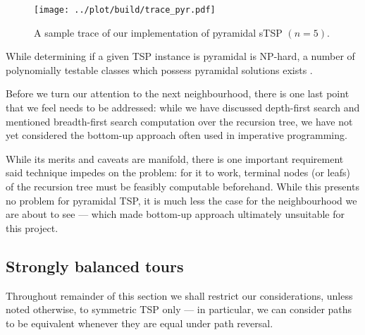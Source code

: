 \documentclass[titlepage,twoside,index=totoc,bibliography=totoc]{scrartcl}
\numberwithin{equation}{section}
\numberwithin{figure}{section}
\numberwithin{table}{section}
\begin{document}
\begin{figure}[hbt]
\centering
\texttt{[image: ../plot/build/trace\_pyr.pdf]}
\caption{A sample trace of our implementation of pyramidal sTSP $(n = 5)$.}
\label{fig:pyrstrace}
\end{figure}

\begin{remark}
While determining if a given TSP instance is pyramidal is NP-hard,
a number of polynomially testable classes which possess
pyramidal solutions exists \cite{baki}.
\end{remark}

Before we turn our attention to the next neighbourhood, there is one last
point that we feel needs to be addressed: while we have discussed
depth-first search and mentioned breadth-first search computation over the
recursion tree, we have not yet considered the bottom-up approach often
used in imperative programming.

While its merits and caveats
are manifold, there is one important requirement said technique impedes on the
problem: for it to work, terminal nodes (or leafs) of the recursion tree
must be feasibly computable beforehand.  While this presents no problem
for pyramidal TSP, it is much less the case for the neighbourhood we are
about to see --- which made bottom-up approach ultimately unsuitable for
this project.

\subsection{Strongly balanced tours}

Throughout remainder of this section we shall restrict our considerations,
unless noted otherwise, to symmetric TSP only --- in particular, we can
consider paths to be equivalent whenever they are equal under path
reversal. %
\end{document}
